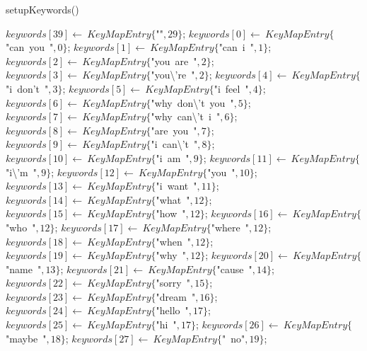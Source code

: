 \documentclass[a4paper,10pt]{article}
\begin{document}
\begin{algorithm}
\caption{setupKeywords()}
\begin{algorithmic}[5]

\STATE {}
\STATE {}
\STATE {}
  \STATE \(keywords[39]\gets\ KeyMapEntry\{\)"{}"{}\(,29\}\);
  \STATE \(keywords[0]\gets\ KeyMapEntry\{\)"{}can\ you\ "{}\(,0\}\);
  \STATE \(keywords[1]\gets\ KeyMapEntry\{\)"{}can\ i\ "{}\(,1\}\);
  \STATE \(keywords[2]\gets\ KeyMapEntry\{\)"{}you\ are\ "{}\(,2\}\);
  \STATE \(keywords[3]\gets\ KeyMapEntry\{\)"{}you\textbackslash{}'{}re\ "{}\(,2\}\);
  \STATE \(keywords[4]\gets\ KeyMapEntry\{\)"{}i\ don'{}t\ "{}\(,3\}\);
  \STATE \(keywords[5]\gets\ KeyMapEntry\{\)"{}i\ feel\ "{}\(,4\}\);
  \STATE \(keywords[6]\gets\ KeyMapEntry\{\)"{}why\ don\textbackslash{}'{}t\ you\ "{}\(,5\}\);
  \STATE \(keywords[7]\gets\ KeyMapEntry\{\)"{}why\ can\textbackslash{}'{}t\ i\ "{}\(,6\}\);
  \STATE \(keywords[8]\gets\ KeyMapEntry\{\)"{}are\ you\ "{}\(,7\}\);
  \STATE \(keywords[9]\gets\ KeyMapEntry\{\)"{}i\ can\textbackslash{}'{}t\ "{}\(,8\}\);
  \STATE \(keywords[10]\gets\ KeyMapEntry\{\)"{}i\ am\ "{}\(,9\}\);
  \STATE \(keywords[11]\gets\ KeyMapEntry\{\)"{}i\textbackslash{}'{}m\ "{}\(,9\}\);
  \STATE \(keywords[12]\gets\ KeyMapEntry\{\)"{}you\ "{}\(,10\}\);
  \STATE \(keywords[13]\gets\ KeyMapEntry\{\)"{}i\ want\ "{}\(,11\}\);
  \STATE \(keywords[14]\gets\ KeyMapEntry\{\)"{}what\ "{}\(,12\}\);
  \STATE \(keywords[15]\gets\ KeyMapEntry\{\)"{}how\ "{}\(,12\}\);
  \STATE \(keywords[16]\gets\ KeyMapEntry\{\)"{}who\ "{}\(,12\}\);
  \STATE \(keywords[17]\gets\ KeyMapEntry\{\)"{}where\ "{}\(,12\}\);
  \STATE \(keywords[18]\gets\ KeyMapEntry\{\)"{}when\ "{}\(,12\}\);
  \STATE \(keywords[19]\gets\ KeyMapEntry\{\)"{}why\ "{}\(,12\}\);
  \STATE \(keywords[20]\gets\ KeyMapEntry\{\)"{}name\ "{}\(,13\}\);
  \STATE \(keywords[21]\gets\ KeyMapEntry\{\)"{}cause\ "{}\(,14\}\);
  \STATE \(keywords[22]\gets\ KeyMapEntry\{\)"{}sorry\ "{}\(,15\}\);
  \STATE \(keywords[23]\gets\ KeyMapEntry\{\)"{}dream\ "{}\(,16\}\);
  \STATE \(keywords[24]\gets\ KeyMapEntry\{\)"{}hello\ "{}\(,17\}\);
  \STATE \(keywords[25]\gets\ KeyMapEntry\{\)"{}hi\ "{}\(,17\}\);
  \STATE \(keywords[26]\gets\ KeyMapEntry\{\)"{}maybe\ "{}\(,18\}\);
  \STATE \(keywords[27]\gets\ KeyMapEntry\{\)"{}\ no"{}\(,19\}\);

\end{algorithmic}
\end{algorithm}
\end{document}
